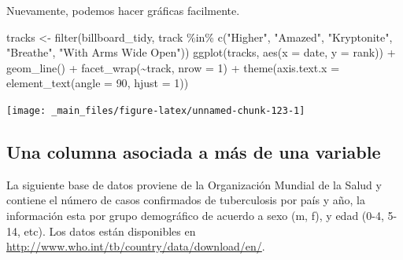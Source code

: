 \documentclass[
]{book}
\newenvironment{Shaded}{\begin{snugshade}}{\end{snugshade}}
\newcommand{\AttributeTok}[1]{\textcolor[rgb]{0.77,0.63,0.00}{#1}}
\newcommand{\DecValTok}[1]{\textcolor[rgb]{0.00,0.00,0.81}{#1}}
\newcommand{\FunctionTok}[1]{\textcolor[rgb]{0.00,0.00,0.00}{#1}}
\newcommand{\NormalTok}[1]{#1}
\newcommand{\OtherTok}[1]{\textcolor[rgb]{0.56,0.35,0.01}{#1}}
\newcommand{\SpecialCharTok}[1]{\textcolor[rgb]{0.00,0.00,0.00}{#1}}
\newcommand{\StringTok}[1]{\textcolor[rgb]{0.31,0.60,0.02}{#1}}
\begin{document}
Nuevamente, podemos hacer gráficas facilmente.

\begin{Shaded}
\begin{Highlighting}[]
\NormalTok{tracks }\OtherTok{\textless{}{-}} \FunctionTok{filter}\NormalTok{(billboard\_tidy, track }\SpecialCharTok{\%in\%} 
    \FunctionTok{c}\NormalTok{(}\StringTok{"Higher"}\NormalTok{, }\StringTok{"Amazed"}\NormalTok{, }\StringTok{"Kryptonite"}\NormalTok{, }\StringTok{"Breathe"}\NormalTok{, }\StringTok{"With Arms Wide Open"}\NormalTok{))}
\FunctionTok{ggplot}\NormalTok{(tracks, }\FunctionTok{aes}\NormalTok{(}\AttributeTok{x =}\NormalTok{ date, }\AttributeTok{y =}\NormalTok{ rank)) }\SpecialCharTok{+}
  \FunctionTok{geom\_line}\NormalTok{() }\SpecialCharTok{+} 
  \FunctionTok{facet\_wrap}\NormalTok{(}\SpecialCharTok{\textasciitilde{}}\NormalTok{track, }\AttributeTok{nrow =} \DecValTok{1}\NormalTok{) }\SpecialCharTok{+} 
  \FunctionTok{theme}\NormalTok{(}\AttributeTok{axis.text.x =} \FunctionTok{element\_text}\NormalTok{(}\AttributeTok{angle =} \DecValTok{90}\NormalTok{, }\AttributeTok{hjust =} \DecValTok{1}\NormalTok{))}
\end{Highlighting}
\end{Shaded}

\begin{center}\texttt{[image: \_main\_files/figure-latex/unnamed-chunk-123-1]} \end{center}

\hypertarget{una-columna-asociada-a-muxe1s-de-una-variable}{%
\subsection*{Una columna asociada a más de una variable}\label{una-columna-asociada-a-muxe1s-de-una-variable}}

La siguiente base de datos proviene de la Organización Mundial de la Salud y
contiene el número de casos confirmados de tuberculosis por país y año, la
información esta por grupo demográfico de acuerdo a sexo (m, f), y edad (0-4,
5-14, etc). Los datos están disponibles en \url{http://www.who.int/tb/country/data/download/en/}.
\end{document}
